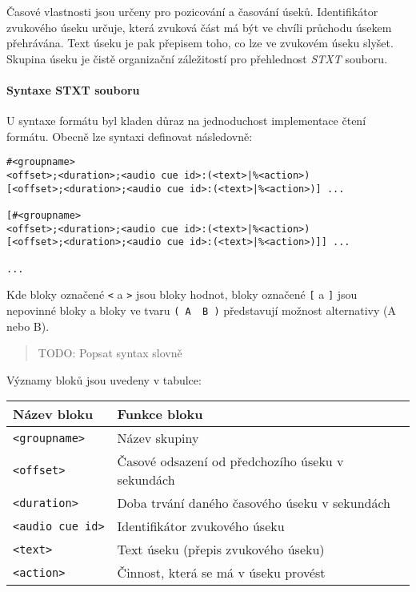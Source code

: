Časové vlastnosti jsou určeny pro pozicování a časování úseků.
Identifikátor zvukového úseku určuje, která zvuková část má být ve
chvíli průchodu úsekem přehrávána. Text úseku je pak přepisem toho, co
lze ve zvukovém úseku slyšet. Skupina úseku je čistě organizační
záležitostí pro přehlednost \emph{STXT} souboru.

\paragraph{Syntaxe STXT souboru}\label{syntaxe-stxt-souboru}

U syntaxe formátu byl kladen důraz na jednoduchost implementace čtení
formátu. Obecně lze syntaxi definovat následovně:

\begin{verbatim}
#<groupname>
<offset>;<duration>;<audio cue id>:(<text>|%<action>)
[<offset>;<duration>;<audio cue id>:(<text>|%<action>)] ...

[#<groupname>
<offset>;<duration>;<audio cue id>:(<text>|%<action>)
[<offset>;<duration>;<audio cue id>:(<text>|%<action>)]] ...

...
\end{verbatim}

Kde bloky označené \texttt{\textless{}} a \texttt{\textgreater{}} jsou
bloky hodnot, bloky označené \texttt{{[}} a \texttt{{]}} jsou nepovinné
bloky a bloky ve tvaru \texttt{(\ A\ \textbar{}\ B\ )} představují
možnost alternativy (A nebo B).

\begin{quote}
TODO: Popsat syntax slovně
\end{quote}

Významy bloků jsou uvedeny v tabulce:

\begin{longtable}[]{@{}ll@{}}
\toprule
Název bloku & Funkce bloku\tabularnewline
\midrule
\endhead
\texttt{\textless{}groupname\textgreater{}} & Název
skupiny\tabularnewline
\texttt{\textless{}offset\textgreater{}} & Časové odsazení od
předchozího úseku v sekundách\tabularnewline
\texttt{\textless{}duration\textgreater{}} & Doba trvání daného časového
úseku v sekundách\tabularnewline
\texttt{\textless{}audio\ cue\ id\textgreater{}} & Identifikátor
zvukového úseku\tabularnewline
\texttt{\textless{}text\textgreater{}} & Text úseku (přepis zvukového
úseku)\tabularnewline
\texttt{\textless{}action\textgreater{}} & Činnost, která se má v úseku
provést\tabularnewline
\bottomrule
\end{longtable}


